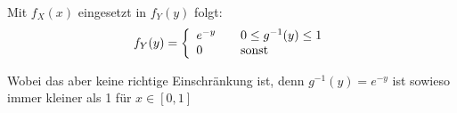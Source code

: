 \begin{uebsp}
\begin{Answer}
Mit $f_X(x)$ eingesetzt in $f_Y(y)$ folgt: \\

\[ f_Y(y) = \left\{
  \begin{array}{l l}
    e^{-y} & \quad \text{$0 \le g^{-1}(y) \le 1$}\\
    0 & \quad \text{sonst} \\
\end{array} \right.\]

Wobei das aber keine richtige Einschränkung ist, denn $g^{-1}(y)=e^{-y}$ ist sowieso immer kleiner als 1 für $x \in [0,1]$

\end{Answer}
\end{uebsp}
